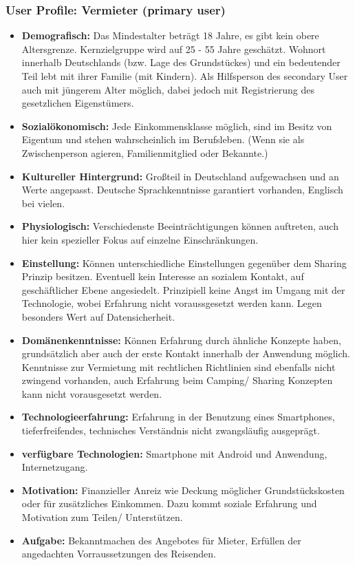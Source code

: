 \subsubsection{User Profile: Vermieter (primary user)}
\begin{itemize}
   \item 
   \textbf{Demografisch:} Das Mindestalter beträgt 18 Jahre, es gibt kein obere Altersgrenze. Kernzielgruppe wird auf 25 - 55 Jahre geschätzt. Wohnort innerhalb Deutschlands (bzw. Lage des Grundstückes) und ein bedeutender Teil lebt mit ihrer Familie (mit Kindern). Als Hilfsperson des secondary User auch mit jüngerem Alter möglich, dabei jedoch mit Registrierung des gesetzlichen Eigenstümers.

   \item 
  \textbf{Sozialökonomisch:} Jede Einkommensklasse möglich, sind im Besitz von Eigentum und stehen wahrscheinlich im Berufsleben. (Wenn sie als Zwischenperson agieren, Familienmitglied oder Bekannte.)

   \item 
   \textbf{Kultureller Hintergrund:} Großteil in Deutschland aufgewachsen und an Werte angepasst. Deutsche Sprachkenntnisse garantiert vorhanden, Englisch bei vielen.

   \item
  \textbf{Physiologisch:} Verschiedenste Beeinträchtigungen können auftreten, auch hier kein spezieller Fokus auf einzelne Einschränkungen.

   \item 
   \textbf{Einstellung:} Können unterschiedliche Einstellungen gegenüber dem Sharing Prinzip besitzen. Eventuell kein Interesse an sozialem Kontakt, auf geschäftlicher Ebene angesiedelt. Prinzipiell keine Angst im Umgang mit der Technologie, wobei Erfahrung nicht voraussgesetzt werden kann. Legen besonders Wert auf Datensicherheit.

   \item 
   \textbf{Domänenkenntnisse:} Können Erfahrung durch ähnliche Konzepte haben, grundsätzlich aber auch der erste Kontakt innerhalb der Anwendung möglich. Kenntnisse zur Vermietung mit rechtlichen Richtlinien sind ebenfalls nicht zwingend vorhanden, auch Erfahrung beim Camping/ Sharing Konzepten kann nicht vorausgesetzt werden.

   \item
   \textbf{Technologieerfahrung:} Erfahrung in der Benutzung eines Smartphones, tieferfreifendes, technisches Verständnis nicht zwangsläufig ausgeprägt.

   \item
   \textbf{verfügbare Technologien:} Smartphone mit Android und Anwendung, Internetzugang.

   \item
   \textbf{Motivation:} Finanzieller Anreiz wie Deckung möglicher Grundstückskosten oder für zusätzliches Einkommen. Dazu kommt soziale Erfahrung und Motivation zum Teilen/ Unterstützen.

   \item
   \textbf{Aufgabe:} Bekanntmachen des Angebotes für Mieter, Erfüllen der angedachten Vorraussetzungen des Reisenden.
   
\end{itemize}
